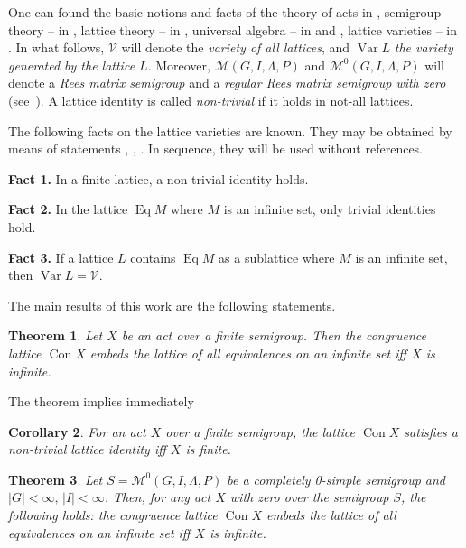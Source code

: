 \documentclass{birkau}
\numberwithin{equation}{section}
\theoremstyle{plain}
\newtheorem{theorem}{Theorem}[section]
\newtheorem{corollary}[theorem]{Corollary}
\theoremstyle{definition}
\DeclareMathOperator{\Con}{Con}
\DeclareMathOperator{\Eq}{Eq}
\DeclareMathOperator{\Var}{Var}
\begin{document}
    One can found the basic notions and facts of the theory of acts in \cite{kilp}, semigroup theory -- in \cite{cliff}, lattice theory -- in \cite{gretz}, universal algebra -- in \cite{burris} and  \cite{kon}, lattice varieties -- in \cite{jipsen}. 	
    In what follows, $\mathcal{V}$ will denote the \textit{variety of all lattices}, and $\Var L$ \textit{the variety generated by the lattice $L$}. Moreover, $\mathcal{M}(G,I,\Lambda,P)$ and $\mathcal{M}^0(G,I,\Lambda,P)$ will denote a \textit{Rees matrix semigroup} and a \textit{regular Rees matrix semigroup with zero} (see~\cite[Chapter 2]{cliff}). A lattice identity is called \textit{non-trivial} if it holds in not-all lattices.
	
	The following facts on the lattice varieties are known. They may be obtained by means of statements \cite[Corollary 3.14]{kon}, \cite[Theorem 1.28]{free_lattices}, \cite{sachs}. In sequence, they will be used without references.

{\bf Fact 1.} In a finite lattice, a non-trivial identity holds.

{\bf Fact 2.} In the lattice $\Eq M$ where $M$ is an infinite set, only trivial identities hold.
	
{\bf Fact 3.} If a lattice $L$ contains $\Eq M$ as a sublattice where $M$ is an infinite set, then $\Var L = \mathcal{V}$.

	
	The main results of this work are the following statements.
	
	\begin{theorem} \label{t01}
	    Let $X$ be an act over a finite semigroup. Then the congruence lattice $\Con X$ embeds the lattice of all equivalences on an infinite set iff $X$ is infinite.
	\end{theorem}
	
	The theorem implies immediately
	
	\begin{corollary}
	    For an act $X$ over a finite semigroup, the lattice $\Con X$ satisfies a non-trivial lattice identity iff $X$ is finite.
	\end{corollary}
	
	\begin{theorem} \label{t02}
	    Let $S = \mathcal{M}^0(G,I,\Lambda,P)$ be a completely 0-simple semigroup and $|G| < \infty,\, |I| < \infty $. Then, for any act $X$ with zero over the semigroup $S$, the following holds: the congruence lattice $\Con X$ embeds the lattice of all equivalences on an infinite set iff $X$ is infinite.
	\end{theorem}
	
\end{document}
